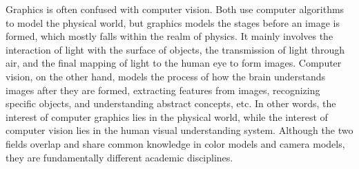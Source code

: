 Graphics is often confused with computer vision. Both use computer algorithms to model the physical world, but graphics models the stages before an image is formed, which mostly falls within the realm of physics. It mainly involves the interaction of light with the surface of objects, the transmission of light through air, and the final mapping of light to the human eye to form images. Computer vision, on the other hand, models the process of how the brain understands images after they are formed, extracting features from images, recognizing specific objects, and understanding abstract concepts, etc. In other words, the interest of computer graphics lies in the physical world, while the interest of computer vision lies in the human visual understanding system. Although the two fields overlap and share common knowledge in color models and camera models, they are fundamentally different academic disciplines.

